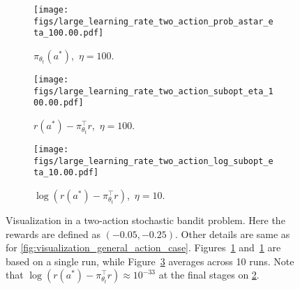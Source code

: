 \begin{figure}[h]
\centering
\begin{subfigure}[b]{.328\linewidth}
\texttt{[image: figs/large\_learning\_rate\_two\_action\_prob\_astar\_eta\_100.00.pdf]}
\caption{$\pi_{\theta_t}(a^*)$, $\, \eta = 100$.}\label{fig:optimal_action_prob_two_action_case_eta_100}
\end{subfigure}
\begin{subfigure}[b]{.328\linewidth}
\texttt{[image: figs/large\_learning\_rate\_two\_action\_subopt\_eta\_100.00.pdf]}
\caption{$r(a^*) - \pi_{\theta_t}^\top r$, $\, \eta = 100$.}\label{fig:sub_optimality_gap_two_action_case_eta_100}
\end{subfigure}
\begin{subfigure}[b]{.328\linewidth}
\texttt{[image: figs/large\_learning\_rate\_two\_action\_log\_subopt\_eta\_10.00.pdf]}
\caption{$\log{ ( r(a^*) - \pi_{\theta_t}^\top r ) }$, $\, \eta = 10$.}\label{fig:sub_optimality_gap_two_action_case_eta_10}
\end{subfigure}
\caption{Visualization in a two-action stochastic bandit problem. Here the rewards are defined as $(-0.05, -0.25)$. Other details are same as for \cref{fig:visualization_general_action_case}. Figures~\ref{fig:optimal_action_prob_two_action_case_eta_100} and~\ref{fig:optimal_action_prob_two_action_case_eta_100} are based on a single run, while Figure~\ref{fig:sub_optimality_gap_two_action_case_eta_10} averages across 10 runs. 
Note that $\log{ ( r(a^*) - \pi_{\theta_t}^\top r ) } 
\approx 10^{-33}$ at the final stages on \cref{fig:sub_optimality_gap_two_action_case_eta_100}.} 
\label{fig:visualization_two_action_case}
\vspace{-10pt}
\end{figure}
